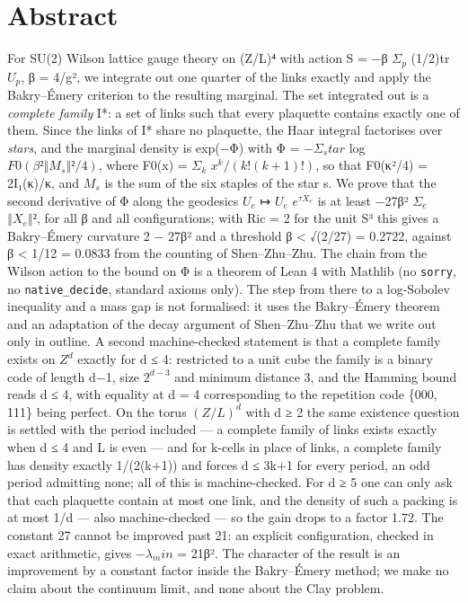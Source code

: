 \documentclass[11pt,a4paper]{article}
\theoremstyle{named}
\begin{document}
\section*{Abstract}
For SU(2) Wilson lattice gauge theory on (Z/L)⁴ with action S = −β $Σ_p$ (1/2)tr $U_p$, β = 4/g², we integrate out one quarter of the links exactly and apply the Bakry–Émery criterion to the resulting marginal. The set integrated out is a \textit{complete family} I*: a set of links such that every plaquette contains exactly one of them. Since the links of I* share no plaquette, the Haar integral factorises over \textit{stars}, and the marginal density is exp(−Φ) with Φ = $−Σ_star$ log $F0(β²‖M_s‖²/4)$, where F0(x) = $Σ_k$ $x^k/(k!(k+1)!)$, so that F0(κ²/4) = 2I₁(κ)/κ, and $M_s$ is the sum of the six staples of the star s. We prove that the second derivative of Φ along the geodesics $U_e$ ↦ $U_e$ $e^{τX_e}$ is at least −27β² $Σ_e$ $‖X_e‖²$, for all β and all configurations; with Ric = 2 for the unit S³ this gives a Bakry–Émery curvature 2 − 27β² and a threshold β \textless{} √(2/27) = 0.2722, against β \textless{} 1/12 = 0.0833 from the counting of Shen–Zhu–Zhu. The chain from the Wilson action to the bound on Φ is a theorem of Lean 4 with Mathlib (no \texttt{sorry}, no \texttt{native\_\allowbreak{}decide}, standard axioms only). The step from there to a log-Sobolev inequality and a mass gap is not formalised: it uses the Bakry–Émery theorem and an adaptation of the decay argument of Shen–Zhu–Zhu that we write out only in outline. A second machine-checked statement is that a complete family exists on $Z^d$ exactly for d ≤ 4: restricted to a unit cube the family is a binary code of length d−1, size $2^{d−3}$ and minimum distance 3, and the Hamming bound reads d ≤ 4, with equality at d = 4 corresponding to the repetition code \{000, 111\} being perfect. On the torus $(Z/L)^d$ with d ≥ 2 the same existence question is settled with the period included — a complete family of links exists exactly when d ≤ 4 and L is even — and for k-cells in place of links, a complete family has density exactly 1/(2(k+1)) and forces d ≤ 3k+1 for every period, an odd period admitting none; all of this is machine-checked. For d ≥ 5 one can only ask that each plaquette contain at most one link, and the density of such a packing is at most 1/d — also machine-checked — so the gain drops to a factor 1.72. The constant 27 cannot be improved past 21: an explicit configuration, checked in exact arithmetic, gives $−λ_min$ = 21β². The character of the result is an improvement by a constant factor inside the Bakry–Émery method; we make no claim about the continuum limit, and none about the Clay problem.
\end{document}
